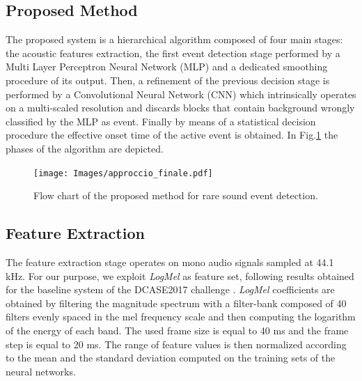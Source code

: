 \documentclass{article}
\begin{document}
\begin{sloppy}
\section{Proposed Method}
\label{sec:proposed-meth}
The proposed system is a hierarchical algorithm composed of four main stages: the acoustic features extraction, the first event detection stage performed by a Multi Layer Perceptron Neural Network (MLP) and a dedicated smoothing procedure of its output. Then, a refinement of the previous decision stage is performed by a Convolutional Neural Network (CNN) which intrinsically operates on a multi-scaled resolution and discards blocks that contain background wrongly classified by the MLP as event. Finally by means of a statistical decision procedure the effective onset time of the active event is obtained. In Fig.\ref{fig:flow-chart} the phases of the algorithm are depicted.

\begin{figure}[t]
  \centering
  \texttt{[image: Images/approccio\_finale.pdf]}
  \caption{Flow chart of the proposed method for rare sound event detection.}
  \label{fig:flow-chart}
\end{figure}

\vspace{0.1cm}

\subsection{Feature Extraction}
The feature extraction stage operates on mono audio signals sampled at 44.1 kHz. For our purpose, we exploit \textit{LogMel} as feature set, following results obtained for the baseline system of the DCASE2017 challenge \cite{DCASE2017challenge}. \textit{LogMel} coefficients are obtained by filtering the magnitude spectrum with a filter-bank composed of 40 filters evenly spaced in the mel frequency scale and then computing the logarithm of the energy of each band. The used frame size is equal to 40 ms and the frame step is equal to 20 ms. 
The range of feature values is then normalized according to the mean and the standard deviation computed on the training sets of the neural networks.

\end{sloppy}
\end{document}
